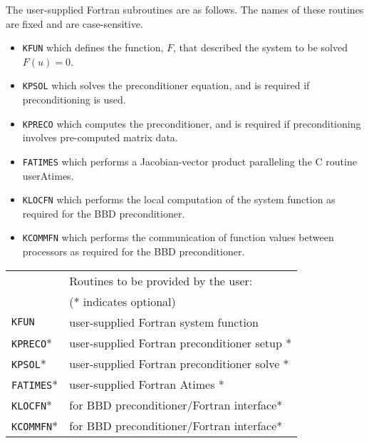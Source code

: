 The user-supplied Fortran subroutines are as follows.  The names of
these routines are fixed and are case-sensitive.

\begin{itemize}
\item  {\tt KFUN} which defines the function, $F$, that described the system
to be solved  $F(u) = 0$.

\item  {\tt KPSOL} which solves the preconditioner equation, and is required
if preconditioning is used.

\item  {\tt KPRECO} which computes the preconditioner, and is required if
preconditioning involves pre-computed matrix data.

\item {\tt FATIMES} which performs a Jacobian-vector product paralleling the
C routine userAtimes.

\item {\tt KLOCFN} which performs the local computation of the system function
as required for the BBD preconditioner.

\item {\tt KCOMMFN} which performs the communication of function values between
processors as
required for the BBD preconditioner.

\end{itemize}

\begin{table}[htb]
\begin{center}
\begin{tabular}{|l|l|} \hline
  &Routines to be provided by the user: \\ 
  &   (* indicates optional) \\ \hline \hline
{\tt KFUN} & user-supplied Fortran system function \\ \hline
{\tt KPRECO}* & user-supplied Fortran preconditioner setup * \\ \hline
{\tt KPSOL}* & user-supplied Fortran preconditioner solve * \\ \hline
{\tt FATIMES}* & user-supplied Fortran Atimes * \\ \hline
{\tt KLOCFN}* & for BBD preconditioner/Fortran interface* \\ \hline
{\tt KCOMMFN}* & for BBD preconditioner/Fortran interface* \\ \hline
\end{tabular}
\end{center}
\end{table}


